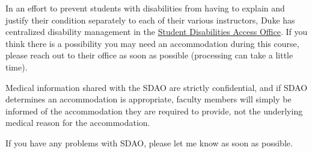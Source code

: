 \documentclass[12pt]{article}
\begin{document}
In an effort to prevent students with disabilities from having to explain and justify their condition separately to each of their various instructors, Duke has centralized disability management in the \href{https://access.duke.edu/students}{Student Disabilities Access Office}. If you think there is a possibility you may need an accommodation during this course, please reach out to their office as soon as possible (processing can take a little time).

Medical information shared with the SDAO are strictly confidential, and if SDAO determines an accommodation is appropriate, faculty members will simply be informed of the accommodation they are required to provide, not the underlying medical reason for the accommodation.

If you have any problems with SDAO, please let me know as soon as possible.
\end{document}
